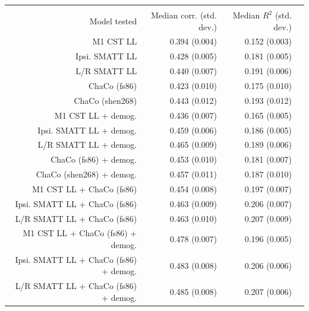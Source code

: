 \documentclass[10pt]{article}
\begin{document}
\begin{table}
\begin{tabular}{rrrr}
\hline\\
             Model tested & Median corr. (std. dev.) & Median $R^2$ (std. dev.)  \\
                                     \hline
                                        M1 CST LL &    0.394 (0.004) &        0.152 (0.003) \\
                            Ipsi. SMATT LL &    0.428 (0.005) &        0.181 (0.005) \\
                                     L/R SMATT LL &    0.440 (0.007) &        0.191 (0.006) \\
                                     ChaCo (fs86) &    0.423 (0.010) &        0.175 (0.010) \\
                                  ChaCo (shen268) &    0.443 (0.012) &        0.193 (0.012) \\
                               M1 CST LL + demog. &    0.436 (0.007) &        0.165 (0.005) \\
                    Ipsi. SMATT LL + demog. &    0.459 (0.006) &        0.186 (0.005) \\
                            L/R SMATT LL + demog. &    0.465 (0.009) &        0.189 (0.006) \\
                            ChaCo (fs86) + demog. &    0.453 (0.010) &        0.181 (0.007) \\
                         ChaCo (shen268) + demog. &    0.457 (0.011) &        0.187 (0.010) \\
                     M1 CST LL + ChaCo (fs86) &    0.454 (0.008) &        0.197 (0.007) \\
          Ipsi. SMATT LL + ChaCo (fs86) &    0.463 (0.009) &        0.206 (0.007) \\
                  L/R SMATT LL + ChaCo (fs86) &    0.463 (0.010) &        0.207 (0.009) \\
            M1 CST LL + ChaCo (fs86) + demog. &    0.478 (0.007) &        0.196 (0.005) \\
 Ipsi. SMATT LL + ChaCo (fs86) + demog. &    0.483 (0.008) &        0.206 (0.006) \\
         L/R SMATT LL + ChaCo (fs86) + demog. &    0.485 (0.008) &        0.207 (0.006) \\
\end{tabular}



\end{table}
\end{document}
